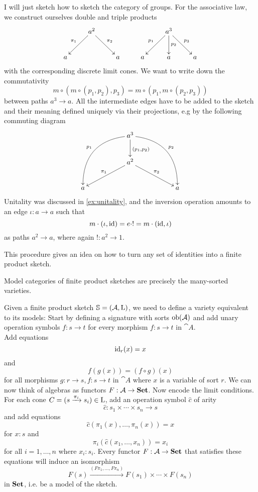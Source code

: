 \begin{Example}[Groups]
I will just sketch how to sketch the category of groups. For the associative law, we construct ourselves double and triple products
\[
\xymatrix{
  & a^2 \ar[ld]_{\pi_1} \ar[rd]^{\pi_2} &    & & a^3 \ar[ld]_{p_1} \ar[d]^{p_2} \ar[rd]^{p_3} & \\
a &     & a & a & a & a
}\]
with the corresponding discrete limit cones. We want to write down the commutativity
\[ m \circ (m \circ (p_1, p_2), p_3) = m \circ (p_1, m \circ (p_2,p_3)) \]
between paths $a^3 \to a$. All the intermediate edges have to be added to the sketch and their meaning defined uniquely via their projections, e.g by the following commuting diagram
\[
\xymatrix{
& & a^3 \ar[d]^{(p_1,p_2)} \ar@/_2pc/[lldd]_{p_1} \ar@/^2pc/[rrdd]^{p_2} & \\
& & a^2 \ar[lld]_{\pi_1} \ar[rrd]^{\pi_2} & \\
a & & & & a
}\]
Unitality was discussed in \ref{ex:unitality}, and the inversion operation amounts to an edge $\iota : a \to a$ such that \[ m \cdot (\iota, \textrm{id}) = e \cdot ! = m \cdot (\textrm{id}, \iota) \]
as paths $a^2 \to a$, where again $!: a^2 \to 1$. 
\end{Example}

This procedure gives an idea on how to turn any set of identities into a finite product sketch.
\begin{Proposition}
Model categories of finite product sketches are precisely the many-sorted varieties.
\end{Proposition}
\begin{Proof}
Given a finite product sketch $\mathbb S = (\mathcal{A}, \textrm{L})$, we need to define a variety equivalent to its models: Start by defining a signature with sorts $\textrm{ob}(\mathcal{A})$ and add unary operation symbols $f : s \to t$ for every morphism $f : s \to t$ in $\cat A$. \\

Add equations
\[ \textrm{id}_r(x) = x \]
and
\[ f(g(x)) = (f \circ g)(x)  \]
for all morphisms $g : r \to s, f : s \to t$ in $\cat A$ where $x$ is a variable of sort $r$. We can now think of algebras as functors $F : \mathcal{A} \to \mathbf{Set}$. Now encode the limit conditions. For each cone $C = (s \xrightarrow{\pi_i} s_i) \in \textrm{L}$, add an operation symbol $\hat c$ of arity
\[ \hat c : s_1 \times \cdots \times s_n \to s \]
and add equations
\[ \hat c(\pi_1(x), \ldots, \pi_n(x)) = x \]
for $x : s$ and 
\[ \pi_i(\hat c(x_1, \ldots, x_n)) = x_i \]
for all $i=1,\ldots,n$ where $x_i : s_i$.
Every functor $F : \mathcal{A} \to \mathbf{Set}$ that satisfies these equations will induce an isomorphism
\[ F(s) \xrightarrow{(F\pi_1,\ldots, F\pi_n)} F(s_1) \times \cdots \times F(s_n) \]
in $\mathbf{Set}$, i.e. be a model of the sketch.
\end{Proof}

